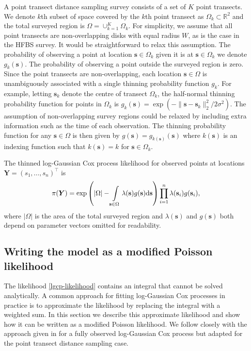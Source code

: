 \documentclass{stylefile16/statsoc}
\newcommand{\bs}{\mathbf{s}}
\newcommand{\bm}{\boldsymbol}  %
\begin{document}
A point transect distance sampling survey consists of a set of $K$ point transects.   We denote $k$th subset of space covered by the $k$th point transect as $\Omega_k \subset \mathbb{R}^2$ and the total surveyed region is $\Omega = \cup_{k=1}^K \Omega_k$.  For simplicity, we assume that all point transects are non-overlapping disks with equal radius $W$, as is the case in the HFBS survey.  It would be straightforward to relax this assumption.  The probability of observing a point at location $\bs \in \Omega_k$ given it is at $\bs \in \Omega_k$ we denote $g_k(\bs)$.  The probability of observing a point outside the surveyed region is zero.
Since the point transects are non-overlapping, each location $\bs \in \Omega$ is unambiguously associated with a single thinning probability function $g_k$.  For example, letting $\bs_k$ denote the centre of transect $\Omega_k$, the half-normal thinning probability function for points in $\Omega_k$ is $g_k(\bs) = \exp(-\lVert \bs - \bs_k \rVert_2^2 / 2\sigma^2)$.  The assumption of non-overlapping survey regions could be relaxed by including extra information such as the time of each observation.  The thinning probability function for any $\bs \in \Omega$ is then given by $g(\bs) = g_{k(\bs)}(\bs)$ where $k(\bs)$ is an indexing function such that $k(\bs) = k$ for $\bs \in \Omega_k$.

The thinned log-Gaussian Cox process likelihood for observed points at locations $\bm{Y} = (s_1, \ldots, s_n)^\intercal$ is
\begin{equation}
\label{lgcp-likelihood}
\pi(\bm{Y}) = \exp\left( |\Omega| -\int\displaylimits_{\bs \in \Omega} \lambda(\bs) g(\bs) \mathrm{d}\bs \right)\prod_{i=1}^n \lambda(\bs_i)g(\bs_i),
\end{equation}
where $|\Omega|$ is the area of the total surveyed region and $\lambda(\bs)$ and $g(\bs)$ both depend on parameter vectors omitted for readability.  

\subsection{Writing the model as a modified Poisson likelihood}

\sloppy The likelihood \eqref{lgcp-likelihood} contains an integral that cannot be solved analytically.  A common approach for fitting log-Gaussian Cox processes in practice is to approximate the likelihood by replacing the integral with a weighted sum.  In this section we describe this approximate likelihood and show how it can be written as a modified Poisson likelihood.  We follow closely with the approach given in \cite{simpson_going_2016} for a fully observed log-Gaussian Cox process but adapted for the point transect distance sampling case.
\end{document}
